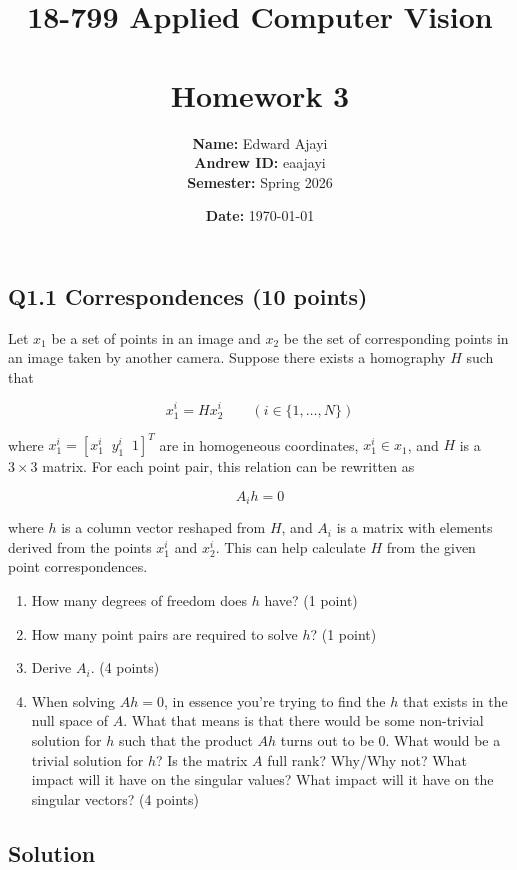 \documentclass[12pt]{article}
\title{18-799 Applied Computer Vision \\\\ Homework 3}
\author{\textbf{Name:} Edward Ajayi \\ \textbf{Andrew ID:} eaajayi \\ \textbf{Semester: }Spring 2026} %
\date{\textbf{Date: }\today}
\begin{document}
\maketitle
\newpage
\subsection*{Q1.1 Correspondences (10 points)}

Let $x_1$ be a set of points in an image and $x_2$ be the set of corresponding points in an image taken by another camera. Suppose there exists a homography $H$ such that

\begin{equation}
x_1^i = H x_2^i \qquad (i \in \{1,\dots,N\})
\end{equation}

where $x_1^i = [x_1^i \;\; y_1^i \;\; 1]^T$ are in homogeneous coordinates, $x_1^i \in x_1$, and $H$ is a $3 \times 3$ matrix. For each point pair, this relation can be rewritten as

\begin{equation}
A_i h = 0
\end{equation}

where $h$ is a column vector reshaped from $H$, and $A_i$ is a matrix with elements derived from the points $x_1^i$ and $x_2^i$. This can help calculate $H$ from the given point correspondences.

\begin{enumerate}
\item How many degrees of freedom does $h$ have? \hfill (1 point)

\item How many point pairs are required to solve $h$? \hfill (1 point)

\item Derive $A_i$. \hfill (4 points)

\item When solving $Ah = 0$, in essence you're trying to find the $h$ that exists in the null space of $A$. What that means is that there would be some non-trivial solution for $h$ such that the product $Ah$ turns out to be $0$. What would be a trivial solution for $h$? Is the matrix $A$ full rank? Why/Why not? What impact will it have on the singular values? What impact will it have on the singular vectors? \hfill (4 points)

\end{enumerate}

\subsection*{Solution}
\end{document}
